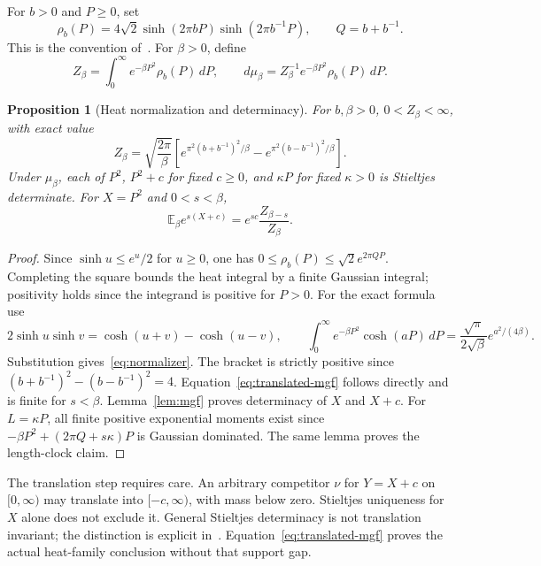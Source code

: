 \documentclass[11pt]{article}
\newtheorem{proposition}[theorem]{Proposition}
\theoremstyle{definition}
\newcommand{\E}{\mathbb E}
\begin{document}
For $b>0$ and $P\geq0$, set
\begin{equation}
 \rho_b(P)=4\sqrt2\sinh(2\pi bP)\sinh(2\pi b^{-1}P),
 \qquad Q=b+b^{-1}.
 \label{eq:density}
\end{equation}
This is the convention of~\cite[Eq.~(2.23)]{CollierEberhardtZhang2023}.
For $\beta>0$, define
\begin{equation}
 Z_\beta=\int_0^\infty e^{-\beta P^2}\rho_b(P)\,dP,
 \qquad d\mu_\beta=Z_\beta^{-1}e^{-\beta P^2}\rho_b(P)\,dP.
 \label{eq:heat}
\end{equation}

\begin{proposition}[Heat normalization and determinacy]
\label{prop:heat}
For $b,\beta>0$, $0<Z_\beta<\infty$, with exact value
\begin{equation}
 Z_\beta=\sqrt{\frac{2\pi}{\beta}}
 \left[e^{\pi^2(b+b^{-1})^2/\beta}
       -e^{\pi^2(b-b^{-1})^2/\beta}\right].
 \label{eq:normalizer}
\end{equation}
Under $\mu_\beta$, each of $P^2$, $P^2+c$ for fixed $c\geq0$, and $\kappa P$ for fixed $\kappa>0$ is Stieltjes determinate.
For $X=P^2$ and $0<s<\beta$,
\begin{equation}
 \E_\beta e^{s(X+c)}=e^{sc}\frac{Z_{\beta-s}}{Z_\beta}.
 \label{eq:translated-mgf}
\end{equation}
\end{proposition}
\begin{proof}
Since $\sinh u\leq e^u/2$ for $u\geq0$, one has
$0\leq\rho_b(P)\leq\sqrt2 e^{2\pi QP}$.
Completing the square bounds the heat integral by a finite Gaussian integral; positivity holds since the integrand is positive for $P>0$.
For the exact formula use
\begin{equation}
 2\sinh u\sinh v=\cosh(u+v)-\cosh(u-v),\qquad
 \int_0^\infty e^{-\beta P^2}\cosh(aP)\,dP
 =\frac{\sqrt\pi}{2\sqrt\beta}e^{a^2/(4\beta)}.
\end{equation}
Substitution gives~\eqref{eq:normalizer}.
The bracket is strictly positive since
$(b+b^{-1})^2-(b-b^{-1})^2=4$.
Equation~\eqref{eq:translated-mgf} follows directly and is finite for $s<\beta$.
Lemma~\ref{lem:mgf} proves determinacy of $X$ and $X+c$.
For $L=\kappa P$, all finite positive exponential moments exist since
$-\beta P^2+(2\pi Q+s\kappa)P$ is Gaussian dominated.
The same lemma proves the length-clock claim.
\end{proof}

The translation step requires care.
An arbitrary competitor $\nu$ for $Y=X+c$ on $[0,\infty)$ may translate into $[-c,\infty)$, with mass below zero.
Stieltjes uniqueness for $X$ alone does not exclude it.
General Stieltjes determinacy is not translation invariant; the distinction is explicit in~\cite[Section 3 and Appendix C]{Simon1998}.
Equation~\eqref{eq:translated-mgf} proves the actual heat-family conclusion without that support gap.
\end{document}

